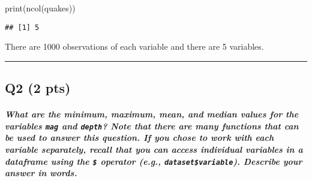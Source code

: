 \documentclass[
]{article}
\newenvironment{Shaded}{\begin{snugshade}}{\end{snugshade}}
\newcommand{\FunctionTok}[1]{\textcolor[rgb]{0.00,0.00,0.00}{#1}}
\newcommand{\NormalTok}[1]{#1}
\begin{document}
\begin{Shaded}
\begin{Highlighting}[]
\FunctionTok{print}\NormalTok{(}\FunctionTok{ncol}\NormalTok{(quakes))}
\end{Highlighting}
\end{Shaded}

\begin{verbatim}
## [1] 5
\end{verbatim}

There are 1000 observations of each variable and there are 5 variables.

\begin{center}\rule{0.5\linewidth}{0.5pt}\end{center}

\hypertarget{q2-2-pts}{%
\subsection{Q2 (2 pts)}\label{q2-2-pts}}

\hypertarget{what-are-the-minimum-maximum-mean-and-median-values-for-the-variables-mag-and-depth-note-that-there-are-many-functions-that-can-be-used-to-answer-this-question.-if-you-chose-to-work-with-each-variable-separately-recall-that-you-can-access-individual-variables-in-a-dataframe-using-the-operator-e.g.-datasetvariable.-describe-your-answer-in-words.}{%
\subparagraph{\texorpdfstring{What are the minimum, maximum, mean, and
median values for the variables \texttt{mag} and \texttt{depth}? Note
that there are many functions that can be used to answer this question.
If you chose to work with each variable separately, recall that you can
access individual variables in a dataframe using the \texttt{\$}
operator (e.g., \texttt{dataset\$variable}). Describe your answer in
words.}{What are the minimum, maximum, mean, and median values for the variables mag and depth? Note that there are many functions that can be used to answer this question. If you chose to work with each variable separately, recall that you can access individual variables in a dataframe using the \$ operator (e.g., dataset\$variable). Describe your answer in words.}}\label{what-are-the-minimum-maximum-mean-and-median-values-for-the-variables-mag-and-depth-note-that-there-are-many-functions-that-can-be-used-to-answer-this-question.-if-you-chose-to-work-with-each-variable-separately-recall-that-you-can-access-individual-variables-in-a-dataframe-using-the-operator-e.g.-datasetvariable.-describe-your-answer-in-words.}}
\end{document}
